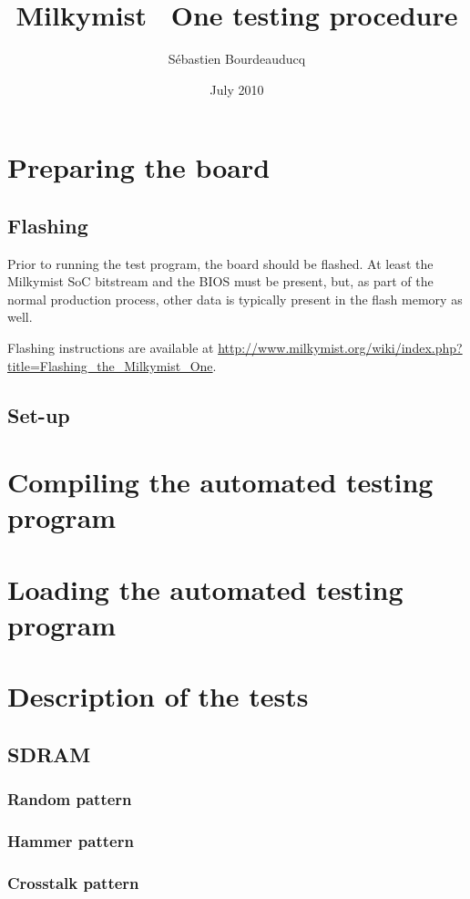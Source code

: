 \documentclass[a4paper,11pt]{article}
\title{Milkymist\texttrademark~ One testing procedure}
\author{S\'ebastien Bourdeauducq}
\date{July 2010}
\begin{document}
\setlength{\parindent}{0pt}
\setlength{\parskip}{5pt}
\maketitle{}


\section{Preparing the board}
\subsection{Flashing}
Prior to running the test program, the board should be flashed. At least the Milkymist SoC bitstream and the BIOS must be present, but, as part of the normal production process, other data is typically present in the flash memory as well.

Flashing instructions are available at \url{http://www.milkymist.org/wiki/index.php?title=Flashing_the_Milkymist_One}.

\subsection{Set-up}
\section{Compiling the automated testing program}
\section{Loading the automated testing program}
\section{Description of the tests}
\subsection{SDRAM}
\subsubsection{Random pattern}
\subsubsection{Hammer pattern}
\subsubsection{Crosstalk pattern}
\end{document}
